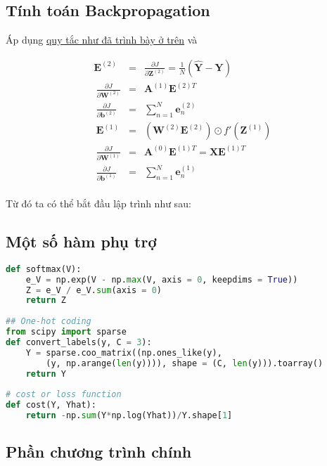  
\subsection{Tính toán Backpropagation}
Áp dụng \href{http://machinelearningcoban.com#-backpropagation-cho-batch-mini-batch-gradient-descent}{quy tắc như đã trình bày ở trên} và 
 
\begin{eqnarray} 
\mathbf{E}^{(2)} &=& \frac{\partial J}{\partial \mathbf{Z}^{(2)}} =\frac{1}{N}(\mathbf{\hat{Y}} - \mathbf{Y}) \\\ 
\frac{\partial J}{\partial \mathbf{W}^{(2)}} &=& \mathbf{A}^{(1)}  \mathbf{E}^{(2)T} \\\ 
\frac{\partial J}{\partial \mathbf{b}^{(2)}} &=& \sum_{n=1}^N\mathbf{e}_n^{(2)} \\\ 
\mathbf{E}^{(1)} &=& \left(\mathbf{W}^{(2)}\mathbf{E}^{(2)}\right) \odot f'(\mathbf{Z}^{(1)}) \\\ 
\frac{\partial J}{\partial \mathbf{W}^{(1)}} &=& \mathbf{A}^{(0)}  \mathbf{E}^{(1)T} = \mathbf{X}\mathbf{E}^{(1)T}\\\ 
\frac{\partial J}{\partial \mathbf{b}^{(1)}} &=& \sum_{n=1}^N\mathbf{e}_n^{(1)} \\\ 
\end{eqnarray} 
 
Từ đó ta có thể bắt đầu lập trình như sau: 
 
 
\subsection{Một số hàm phụ trợ}
 
\begin{lstlisting}[language=Python]
def softmax(V): 
    e_V = np.exp(V - np.max(V, axis = 0, keepdims = True)) 
    Z = e_V / e_V.sum(axis = 0) 
    return Z 
 
## One-hot coding 
from scipy import sparse 
def convert_labels(y, C = 3): 
    Y = sparse.coo_matrix((np.ones_like(y), 
        (y, np.arange(len(y)))), shape = (C, len(y))).toarray() 
    return Y 
 
# cost or loss function 
def cost(Y, Yhat): 
    return -np.sum(Y*np.log(Yhat))/Y.shape[1] 
\end{lstlisting}
 
 
 
\subsection{Phần chương trình chính}
 
